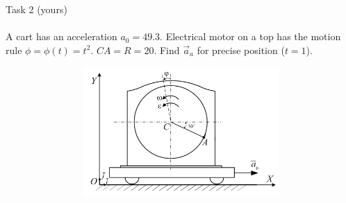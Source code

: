 \documentclass[aspectratio=169]{beamer}
\newcommand{\fbckg}[1]{\usebackgroundtemplate{\texttt{[image: \#1]}}}%
\begin{document}
\begin{frame}[t]{Task 2 (yours)}
\framesubtitle{}
    A cart has an acceleration $a_0=49.3$. Electrical motor on a top has the motion rule $\phi=\phi(t)=t^2$. $CA=R=20$.
    Find $\vec{a}_a$ for precise position ($t=1$).  
    \begin{figure}[H]
            \centering\includegraphics[height=5cm,width=1\textwidth,keepaspectratio]{image11.png}
            \label{fig:image11}
    \end{figure}
\end{frame}

\fbckg{fibeamer/figs/last_page.png}
\frame[plain]{}
\end{document}
